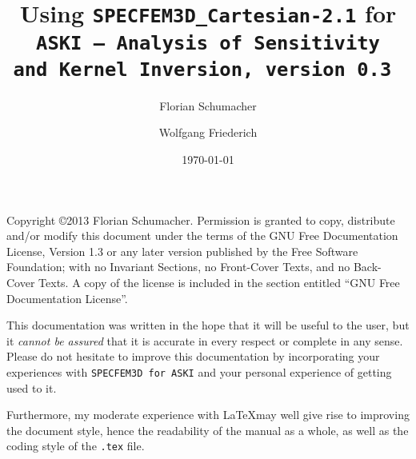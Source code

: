 \documentclass[12pt,a4paper]{article}
\newcommand{\lcode}[1]{\nolinkurl{#1}}
\begin{document}
%
\setlength{\parindent}{0cm}
\addtolength{\parskip}{0.1cm}
%
%
%
\title{Using {\tt \Huge SPECFEM3D\_Cartesian-2.1} for \\ \tt {\Huge ASKI} {\rm--} {\Huge A}{\large nalysis of} {\Huge S}{\large ensitivity \\ and} {\Huge\tt K}{\large ernel} {\Huge\tt I}{\large nversion, version 0.3} }
\author[1]{Florian Schumacher}
\author[1]{Wolfgang Friederich}
\date{\today}
\maketitle
%
Copyright \copyright 2013 Florian Schumacher.
Permission is granted to copy, distribute and/or modify this document
under the terms of the GNU Free Documentation License, Version 1.3
or any later version published by the Free Software Foundation;
with no Invariant Sections, no Front-Cover Texts, and no Back-Cover Texts.
A copy of the license is included in the section entitled ``GNU
Free Documentation License''.

\vspace{1cm}

This documentation was written in the hope that it will be useful to the user,
but it \emph{cannot be assured} that it is accurate in every respect or complete in any sense.\\
Please do not hesitate to improve this documentation by incorporating your experiences with 
\lcode{SPECFEM3D for ASKI} and your personal experience of getting used to it. 

Furthermore, my moderate experience with \LaTeX may well give rise to improving the document 
style, hence the readability of the manual as a whole, as well as the coding style of the 
\lcode{.tex} file. 
\end{document}

